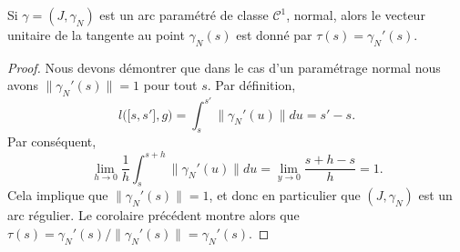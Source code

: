 \begin{corollary}       \label{CorUnitTgtaugpnorma}
	Si \( \gamma=(J,\gamma_N)\) est un arc paramétré de classe \( \mathcal{C}^1\), normal, alors le vecteur unitaire de la tangente au point \( \gamma_N(s)\) est donné par \( \tau(s)=\gamma_N'(s)\).
\end{corollary}

\begin{proof}
	Nous devons démontrer que dans le cas d'un paramétrage normal nous avons \( \| \gamma_N'(s) \|=1\) pour tout \( s\). Par définition,
	\begin{equation}
		l\big( \mathopen[ s , s' \mathclose],g \big)=\int_s^{s'}\| \gamma_N'(u) \|du=s'-s.
	\end{equation}
	Par conséquent,
	\begin{equation}
		\lim_{h\to 0} \frac{1}{ h }\int_s^{s+h}\| \gamma_N'(u) \|du=\lim_{y\to 0} \frac{ s+h-s }{ h }=1.
	\end{equation}
	Cela implique que \( \| \gamma_N'(s) \|=1\), et donc en particulier que \( (J,\gamma_N)\) est un arc régulier. Le corolaire précédent montre alors que \( \tau(s)=\gamma_N'(s)/\| \gamma_N'(s) \|=\gamma_N'(s)\).
\end{proof}

